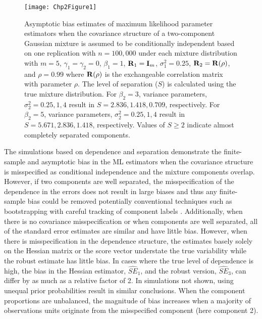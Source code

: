 \begin{figure}[ht]
\centering
\texttt{[image: Chp2Figure1]}
\caption{Asymptotic bias estimates of maximum likelihood parameter estimators when the covariance structure of a two-component Gaussian mixture is assumed to be conditionally independent based on one replication with $n=100,000$ under each mixture distribution with $m=5$, $\gamma_1=\gamma_2=0$, $\beta_{1}=1$, $\mathbf R_1=\mathbf I_{m}$, $\sigma_1^{2}=0.25$,  $\mathbf R_2=\mathbf R(\rho)$, and $\rho=0.99$ where $\mathbf R(\rho)$ is the exchangeable correlation matrix with parameter $\rho$. The level of separation ($S$) is calculated using the true mixture distribution. For $\beta_{2} = 3$, variance parameters, $\sigma_{2}^{2}=0.25,1,4$ result in $S=2.836,1.418, 0.709$, respectively. For $\beta_{2} = 5$, variance parameters, $\sigma_{2}^{2}=0.25,1,4$ result in $S=5.671,2.836,1.418$, respectively. Values of $S\geq 2$ indicate almost completely separated components.}
\label{fig:2-1}
\end{figure}

The simulations based on dependence and separation demonstrate the finite-sample and asymptotic bias in the ML estimators when the covariance structure is misspecified as conditional independence and the mixture components overlap. However, if two components are well separated, the misspecification of the dependence in the errors does not result in large biases and thus any finite-sample bias could be removed potentially conventional techniques such as bootstrapping with careful tracking of component labels \cite{grun2004}. Additionally, when there is no covariance misspecification or when components are well separated, all of the standard error estimates are similar and have little bias. However, when there is misspecification in the dependence structure, the estimates basely solely on the Hessian matrix or the score vector understate the true variability while the robust estimate has little bias. In cases where the true level of dependence is high, the bias in the Hessian estimator, $\widehat{SE}_{1}$, and the robust version, $\widehat{SE}_{3}$, can differ by as much as a relative factor of 2. In simulations not shown, using unequal prior probabilities result in similar conclusions. When the component proportions are unbalanced, the magnitude of bias increases when a majority of observations units originate from the misspecified component (here component 2). 


